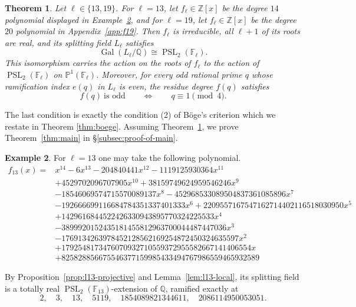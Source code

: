 \documentclass[10pt]{amsart}
\numberwithin{equation}{section}
\newtheorem{theorem}{Theorem}[section]
\theoremstyle{definition}
\newtheorem{example}[theorem]{Example}
\theoremstyle{remark}
\newcommand{\PP}{\mathbb P}
\newcommand{\F}{\mathbb{F}}
\newcommand{\Q}{\mathbb{Q}}
\newcommand{\Z}{\mathbb{Z}}
\newcommand{\PSL}{\operatorname{PSL}}
\newcommand{\Gal}{\operatorname{Gal}}
\begin{document}
\begin{theorem}\label{thm:stems}
Let $\ell\in\{13,19\}$. For $\ell=13$, let $f_\ell\in\Z[x]$ be the degree $14$ polynomial displayed in Example~\textup{\ref{ex:f13}}, and for $\ell=19$, let $f_\ell\in\Z[x]$ be the degree $20$ polynomial in
Appendix~\textup{\ref{app:f19}}.  Then $f_\ell$ is irreducible,
all $\ell+1$ of its roots are real, and its splitting field $L_\ell$
satisfies
\[
 \Gal(L_\ell/\Q)\cong\PSL_2(\F_\ell).
\]
This isomorphism carries the action on the roots of $f_\ell$ to the action of
$\PSL_2(\F_\ell)$ on $\PP^1(\F_\ell)$.  Moreover, for every odd rational prime $q$
whose ramification index $e(q)$ in $L_\ell$ is even, the residue degree
$f(q)$ satisfies
\[
 f(q)\ \text{is odd}
 \qquad\Longleftrightarrow\qquad
 q\equiv1\pmod4 .
\]
\end{theorem}

The last condition is exactly the condition (2) of B\"oge's criterion  which we restate in Theorem \ref{thm:boege}. Assuming Theorem~\ref{thm:stems}, we prove Theorem~\ref{thm:main} in
\S\ref{subsec:proof-of-main}.

\begin{example}\label{ex:f13}
For $\ell=13$ one may take the following polynomial.
\begin{equation}\label{eq:f13-polynomial}
\begin{aligned}
f_{13}(x)={}&x^{14}-6x^{13}-204840441x^{12}-1119125930364x^{11}\\
 &+4529702096707905x^{10}+38159749624959546246x^{9}\\
 &-18546069574715570089137x^{8}-452968533089504837361085896x^{7}\\
 &-192666699116684784351337401333x^{6}+2209557167547162714402116518030950x^{5}\\
 &+1429616844522426330943895770324225533x^{4}\\
 &-3899920152435181455812963700044487447036x^{3}\\
 &-1769134263978452128562169254872450324635597x^{2}\\
 &+1792548173476070932710559372955582667141406554x\\
 &+825828856675546377159985433494767986559465932589
\end{aligned}
\end{equation}

By Proposition~\ref{prop:l13-projective} and Lemma~\ref{lem:l13-local}, its splitting field is a totally real $\PSL_2(\F_{13})$-extension of $\Q$,
ramified exactly at
\[
 2,\quad3,\quad13,\quad5119,\quad
 1854089821344611,\quad2086114950053051.
\]

\end{example}
\end{document}
